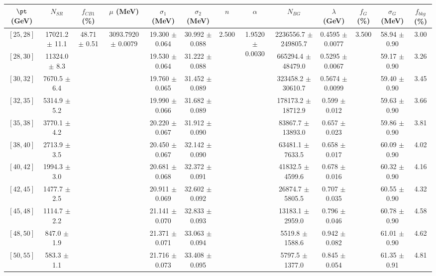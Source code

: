 \begin{tabular}{c||c|c|c|c|c|c|c|c|c|c|c||c}
$\pt$ (GeV) & $N_{SR}$ & $f_{CB1}$ (\%) & $\mu$ (MeV) & $\sigma_1$ (MeV) & $\sigma_2$ (MeV) & $n$ & $\alpha$ & $N_{BG}$ & $\lambda$ (GeV) & $f_G$ (\%) & $\sigma_G$ (MeV) & $f_{bkg}$ (\%) \\
\hline
$[25, 28]$ & 17021.2 $\pm$ 11.1 & \multirow{19}{*}{48.71 $\pm$ 0.51} & \multirow{19}{*}{3093.7920 $\pm$ 0.0079} & 19.300 $\pm$ 0.064 & 30.992 $\pm$ 0.088 & \multirow{19}{*}{2.500} & \multirow{19}{*}{1.9520 $\pm$ 0.0030} & 2236556.7 $\pm$ 249805.7 & 0.4595 $\pm$ 0.0077 & \multirow{19}{*}{3.500} & 58.94 $\pm$ 0.90 & 3.00\\
$[28, 30]$ & 11324.0 $\pm$ 8.3 &  &  & 19.530 $\pm$ 0.064 & 31.222 $\pm$ 0.088 &  &  & 665294.4 $\pm$ 48479.0 & 0.5295 $\pm$ 0.0067 &  & 59.17 $\pm$ 0.90 & 3.26\\
$[30, 32]$ & 7670.5 $\pm$ 6.4 &  &  & 19.760 $\pm$ 0.065 & 31.452 $\pm$ 0.089 &  &  & 323458.2 $\pm$ 30610.7 & 0.5674 $\pm$ 0.0099 &  & 59.40 $\pm$ 0.90 & 3.45\\
$[32, 35]$ & 5314.9 $\pm$ 5.2 &  &  & 19.990 $\pm$ 0.066 & 31.682 $\pm$ 0.089 &  &  & 178173.2 $\pm$ 18712.9 & 0.599 $\pm$ 0.012 &  & 59.63 $\pm$ 0.90 & 3.66\\
$[35, 38]$ & 3770.1 $\pm$ 4.2 &  &  & 20.220 $\pm$ 0.067 & 31.912 $\pm$ 0.090 &  &  & 83867.7 $\pm$ 13893.0 & 0.657 $\pm$ 0.023 &  & 59.86 $\pm$ 0.90 & 3.81\\
$[38, 40]$ & 2713.9 $\pm$ 3.5 &  &  & 20.450 $\pm$ 0.067 & 32.142 $\pm$ 0.090 &  &  & 63481.1 $\pm$ 7633.5 & 0.658 $\pm$ 0.017 &  & 60.09 $\pm$ 0.90 & 4.02\\
$[40, 42]$ & 1994.3 $\pm$ 3.0 &  &  & 20.681 $\pm$ 0.068 & 32.372 $\pm$ 0.091 &  &  & 41832.5 $\pm$ 4599.6 & 0.678 $\pm$ 0.016 &  & 60.32 $\pm$ 0.90 & 4.16\\
$[42, 45]$ & 1477.7 $\pm$ 2.5 &  &  & 20.911 $\pm$ 0.069 & 32.602 $\pm$ 0.092 &  &  & 26874.7 $\pm$ 5805.5 & 0.707 $\pm$ 0.035 &  & 60.55 $\pm$ 0.90 & 4.32\\
$[45, 48]$ & 1114.7 $\pm$ 2.2 &  &  & 21.141 $\pm$ 0.070 & 32.833 $\pm$ 0.093 &  &  & 13183.1 $\pm$ 2959.0 & 0.796 $\pm$ 0.046 &  & 60.78 $\pm$ 0.90 & 4.58\\
$[48, 50]$ & 847.0 $\pm$ 1.9 &  &  & 21.371 $\pm$ 0.071 & 33.063 $\pm$ 0.094 &  &  & 5519.8 $\pm$ 1588.6 & 0.942 $\pm$ 0.082 &  & 61.01 $\pm$ 0.90 & 4.62\\
$[50, 55]$ & 583.3 $\pm$ 1.1 &  &  & 21.716 $\pm$ 0.073 & 33.408 $\pm$ 0.095 &  &  & 5797.5 $\pm$ 1377.0 & 0.845 $\pm$ 0.054 &  & 61.35 $\pm$ 0.91 & 4.81\\

\end{tabular}

